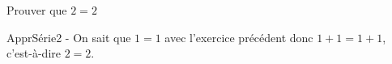 \begin{exercice*}
    Prouver que $2=2$
\end{exercice*}
\begin{corrige}
    ApprSérie2 - On sait que $1=1$ avec l’exercice précédent donc $1+1=1+1$,
    c’est-à-dire $2=2$.
\end{corrige}